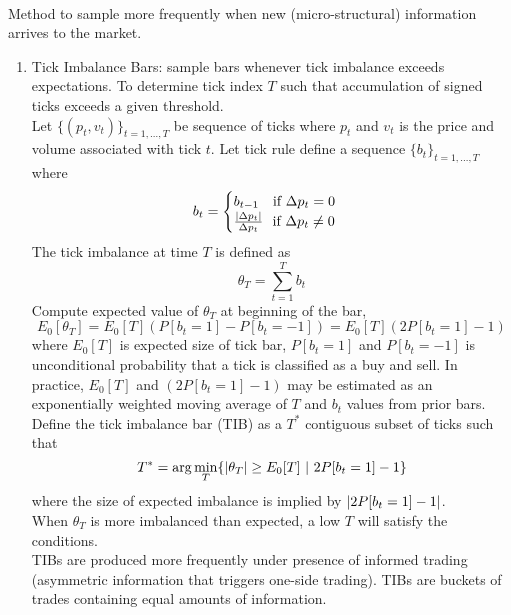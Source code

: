 \begin{remark} \\
Method to sample more frequently when new (micro-structural) information arrives to the market.
\begin{enumerate}[label=\roman*.]
\setlength{\itemsep}{0pt}
\item Tick Imbalance Bars: sample bars whenever tick imbalance exceeds expectations. To determine tick index $T$ such that accumulation of signed ticks exceeds a given threshold.\\
Let $\{(p_t, v_t)\}_{t=1, \ldots, T}$ be sequence of ticks where $p_t$ and $v_t$ is the price and volume associated with tick $t$. Let tick rule define a sequence $\{b_t\}_{t=1, \ldots, T}$ where
\begin{align}
b_t = 
\begin{cases}
b_{t-1} \ \ \ \text{if } \Delta p_t = 0 \\
\frac{\left\lvert\Delta p_t\right\rvert}{\Delta p_t} \ \ \text{if } \Delta p_t \neq 0
\end{cases} \nonumber
\end{align}
The tick imbalance at time $T$ is defined as 
\begin{equation}
\theta_T = \sum\limits_{t=1}^T b_t \nonumber
\end{equation}
Compute expected value of $\theta_T$ at beginning of the bar,
\begin{equation}
E_0[\theta_T] = E_0 [T](P[b_t = 1] - P[b_t = -1]) = E_0 [T](2P[b_t = 1] - 1) \nonumber
\end{equation}
where $E_0[T]$ is expected size of tick bar, $P[b_t = 1]$ and $P[b_t = -1]$ is unconditional probability that a tick is classified as a buy and sell. In practice, $E_0[T]$ and $(2P[b_t = 1] - 1)$ may be estimated as an exponentially weighted moving average of $T$ and $b_t$ values from prior bars.\\
Define the tick imbalance bar (TIB) as a $T^{*}$ contiguous subset of ticks such that
\begin{equation}
T^{*} = \arg \min_T \{ \left\lvert\theta_T\right\rvert \geq E_0 [T] \ \vert \ 2 P[b_t = 1] - 1 \} \nonumber
\end{equation}
where the size of expected imbalance is implied by $\left\lvert2 P[b_t = 1] - 1\right\rvert$.\\
When $\theta_T$ is more imbalanced than expected, a low $T$ will satisfy the conditions.\\
TIBs are produced more frequently under presence of informed trading (asymmetric information that triggers one-side trading). TIBs are buckets of trades containing equal amounts of information.

\end{enumerate}
\end{remark}
